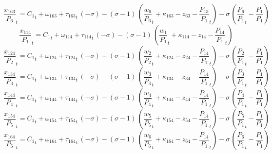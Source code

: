 \begin{dmath}
{{\frac{x_{163}}{P_{6}}}}_{t}={{C_{1}}}_{t}+{{\omega_{163}}}+{{\tau_{163}}}_{t}\, \left(-{{\sigma}}\right)-\left({{\sigma}}-1\right)\, \left({{\frac{w_{6}}{P_{6}}}}_{t}+{{\kappa_{163}}}-{{z_{63}}}-{{\frac{P_{13}}{P_{1}}}}_{t}\right)-{{\sigma}}\, \left({{\frac{P_{6}}{P_{1}}}}_{t}-{{\frac{P_{1}}{P_{1}}}}\right)
\end{dmath}
\begin{dmath}
{{\frac{x_{114}}{P_{1}}}}_{t}={{C_{1}}}_{t}+{{\omega_{114}}}+{{\tau_{114}}}_{t}\, \left(-{{\sigma}}\right)-\left({{\sigma}}-1\right)\, \left({{\frac{w_{1}}{P_{1}}}}_{t}+{{\kappa_{114}}}-{{z_{14}}}-{{\frac{P_{14}}{P_{1}}}}_{t}\right)
\end{dmath}
\begin{dmath}
{{\frac{x_{124}}{P_{2}}}}_{t}={{C_{1}}}_{t}+{{\omega_{124}}}+{{\tau_{124}}}_{t}\, \left(-{{\sigma}}\right)-\left({{\sigma}}-1\right)\, \left({{\frac{w_{2}}{P_{2}}}}_{t}+{{\kappa_{124}}}-{{z_{24}}}-{{\frac{P_{14}}{P_{1}}}}_{t}\right)-{{\sigma}}\, \left({{\frac{P_{2}}{P_{1}}}}_{t}-{{\frac{P_{1}}{P_{1}}}}\right)
\end{dmath}
\begin{dmath}
{{\frac{x_{134}}{P_{3}}}}_{t}={{C_{1}}}_{t}+{{\omega_{134}}}+{{\tau_{134}}}_{t}\, \left(-{{\sigma}}\right)-\left({{\sigma}}-1\right)\, \left({{\frac{w_{3}}{P_{3}}}}_{t}+{{\kappa_{134}}}-{{z_{34}}}-{{\frac{P_{14}}{P_{1}}}}_{t}\right)-{{\sigma}}\, \left({{\frac{P_{3}}{P_{1}}}}_{t}-{{\frac{P_{1}}{P_{1}}}}\right)
\end{dmath}
\begin{dmath}
{{\frac{x_{144}}{P_{4}}}}_{t}={{C_{1}}}_{t}+{{\omega_{144}}}+{{\tau_{144}}}_{t}\, \left(-{{\sigma}}\right)-\left({{\sigma}}-1\right)\, \left({{\frac{w_{4}}{P_{4}}}}_{t}+{{\kappa_{144}}}-{{z_{44}}}-{{\frac{P_{14}}{P_{1}}}}_{t}\right)-{{\sigma}}\, \left({{\frac{P_{4}}{P_{1}}}}_{t}-{{\frac{P_{1}}{P_{1}}}}\right)
\end{dmath}
\begin{dmath}
{{\frac{x_{154}}{P_{5}}}}_{t}={{C_{1}}}_{t}+{{\omega_{154}}}+{{\tau_{154}}}_{t}\, \left(-{{\sigma}}\right)-\left({{\sigma}}-1\right)\, \left({{\frac{w_{5}}{P_{5}}}}_{t}+{{\kappa_{154}}}-{{z_{54}}}-{{\frac{P_{14}}{P_{1}}}}_{t}\right)-{{\sigma}}\, \left({{\frac{P_{5}}{P_{1}}}}_{t}-{{\frac{P_{1}}{P_{1}}}}\right)
\end{dmath}
\begin{dmath}
{{\frac{x_{164}}{P_{6}}}}_{t}={{C_{1}}}_{t}+{{\omega_{164}}}+{{\tau_{164}}}_{t}\, \left(-{{\sigma}}\right)-\left({{\sigma}}-1\right)\, \left({{\frac{w_{6}}{P_{6}}}}_{t}+{{\kappa_{164}}}-{{z_{64}}}-{{\frac{P_{14}}{P_{1}}}}_{t}\right)-{{\sigma}}\, \left({{\frac{P_{6}}{P_{1}}}}_{t}-{{\frac{P_{1}}{P_{1}}}}\right)
\end{dmath}
